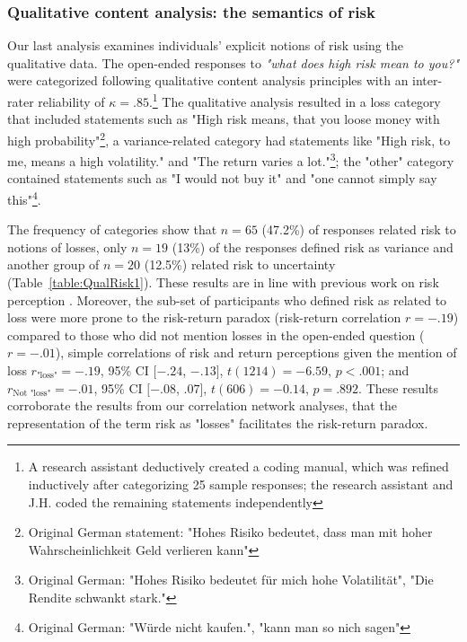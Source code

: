 \documentclass[a4paper,man, natbib,floatsintext]{apa6} %
\begin{document}
\subsubsection{Qualitative content analysis: the semantics of risk}
Our last analysis examines individuals' explicit notions of risk using the qualitative data. The open-ended responses to \textit{"what does high risk mean to you?"} were categorized following qualitative content analysis principles \citep{Mayring2014} with an inter-rater reliability of $\kappa = .85$.\footnote{A research assistant deductively created a coding manual, which was refined inductively after categorizing 25 sample responses; the research assistant and J.H. coded the remaining statements independently} The qualitative analysis resulted in a loss category that included statements such as "High risk means, that you loose money with high probability"\footnote{Original German statement: "Hohes Risiko bedeutet, dass man mit hoher Wahrscheinlichkeit Geld verlieren kann"}, a variance-related category had statements like "High risk, to me, means a high volatility." and "The return varies a lot."\footnote{Original German: "Hohes Risiko bedeutet für mich hohe Volatilität", "Die Rendite schwankt stark."}; the "other" category contained statements such as "I would not buy it" and "one cannot simply say this"\footnote{Original German: "Würde nicht kaufen.", "kann man so nich sagen"}.

The frequency of categories show that $n=65$ (47.2\%) of responses related risk to notions of losses, only $n=
19$ (13\%) of the responses defined risk as variance and another group of $n=20$ (12.5\%) related risk to uncertainty (Table~\ref{table:QualRisk1}). These results are in line with previous work on risk perception \citep[e.g.,][]{Mohr2010, Duxbury2004}. Moreover, the sub-set of participants who defined risk as related to loss were more prone to the risk-return paradox (risk-return correlation $r=-.19$) compared to those who did not mention losses in the open-ended question ($r=-.01$), simple correlations of risk and return perceptions given the mention of loss $r_{\text{"loss"}} = -.19$, 95\% CI $[-.24$, $-.13]$, $t(1214) = -6.59$, $p < .001$; and $r_{\text{Not "loss"}} = -.01$, 95\% CI $[-.08$, $.07]$, $t(606) = -0.14$, $p = .892$. These results corroborate the results from our correlation network analyses, that the representation of the term risk as "losses" facilitates the risk-return paradox.
\end{document}
